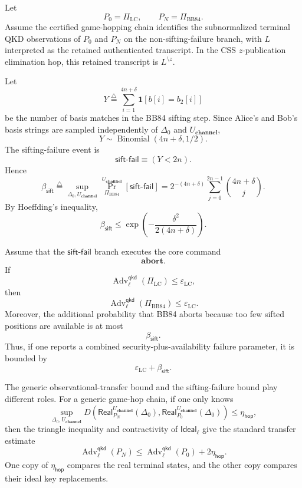 \documentclass[acmsmall,screen,review,anonymous,nonacm]{acmart}
\theoremstyle{defn_style}
\begin{document}
\begin{theorem}
Let
\[
P_0=\Pi_{\mathrm{LC}},
\qquad
P_N=\Pi_{\mathrm{BB84}} .
\]
Assume the certified game-hopping chain identifies the subnormalized terminal
QKD observations of \(P_0\) and \(P_N\) on the non-sifting-failure branch,
with \(L\) interpreted as the retained authenticated transcript.  In the CSS
\(z\)-publication elimination hop, this retained transcript is
\(L^{\setminus z}\).

Let
\[
Y
\stackrel{\triangle}{=}
\sum_{i=1}^{4n+\delta}
\mathbf 1[b[i]=b_2[i]]
\]
be the number of basis matches in the BB84 sifting step. Since Alice's and
Bob's basis strings are sampled independently of \(\Delta_0\) and
\(U_{\textbf{channel}}\),
\[
Y\sim \operatorname{Binomial}(4n+\delta,1/2).
\]
The sifting-failure event is
\[
\mathsf{sift\mbox{-}fail}
\equiv
(Y<2n).
\]
Hence
\[
\beta_{\mathsf{sift}}
\stackrel{\triangle}{=}
\sup_{\Delta_0,U_{\textbf{channel}}}
\Pr_{\Pi_{\mathrm{BB84}}}^{U_{\textbf{channel}}}
[\mathsf{sift\mbox{-}fail}]
=
2^{-(4n+\delta)}
\sum_{j=0}^{2n-1}
\binom{4n+\delta}{j}.
\]
By Hoeffding's inequality,
\[
\beta_{\mathsf{sift}}
\leq
\exp\left(
-\frac{\delta^2}{2(4n+\delta)}
\right).
\]

Assume that the \(\mathsf{sift\mbox{-}fail}\) branch executes the core command
\[
\mathbf{abort}.
\]
If
\[
\operatorname{Adv}^{\mathsf{qkd}}_{\ell}(\Pi_{\mathrm{LC}})
\leq
\varepsilon_{\mathrm{LC}},
\]
then
\[
\operatorname{Adv}^{\mathsf{qkd}}_{\ell}(\Pi_{\mathrm{BB84}})
\leq
\varepsilon_{\mathrm{LC}} .
\]
Moreover, the additional probability that BB84 aborts because too few sifted
positions are available is at most
\[
\beta_{\mathsf{sift}} .
\]
Thus, if one reports a combined security-plus-availability failure parameter,
it is bounded by
\[
\varepsilon_{\mathrm{LC}}+\beta_{\mathsf{sift}}.
\]
\end{theorem}

The generic observational-transfer bound and the sifting-failure bound
play different roles.  For a generic game-hop chain, if one only knows
\[
\sup_{\Delta_0,U_{\textbf{channel}}}
D\left(
\mathsf{Real}_{P_N}^{U_{\textbf{channel}}}(\Delta_0),
\mathsf{Real}_{P_0}^{U_{\textbf{channel}}}(\Delta_0)
\right)
\leq
\eta_{\mathsf{hop}},
\]
then the triangle inequality and contractivity of
\(\mathsf{Ideal}_{\ell}\) give the standard transfer estimate
\[
\operatorname{Adv}^{\mathsf{qkd}}_{\ell}(P_N)
\leq
\operatorname{Adv}^{\mathsf{qkd}}_{\ell}(P_0)
+
2\eta_{\mathsf{hop}} .
\]
One copy of \(\eta_{\mathsf{hop}}\) compares the real terminal states,
and the other copy compares their ideal key replacements.
\end{document}
